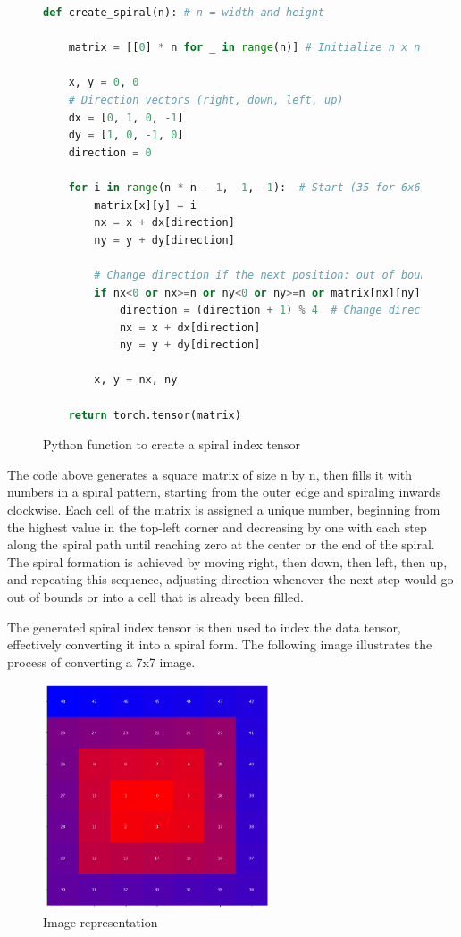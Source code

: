 \begin{figure}[H]
\centering
\begin{lstlisting}[language=Python]
def create_spiral(n): # n = width and height
    
    matrix = [[0] * n for _ in range(n)] # Initialize n x n matrix

    x, y = 0, 0
    # Direction vectors (right, down, left, up)
    dx = [0, 1, 0, -1]
    dy = [1, 0, -1, 0]
    direction = 0

    for i in range(n * n - 1, -1, -1):  # Start (35 for 6x6)
        matrix[x][y] = i
        nx = x + dx[direction]
        ny = y + dy[direction]

        # Change direction if the next position: out of bounds or filled
        if nx<0 or nx>=n or ny<0 or ny>=n or matrix[nx][ny]!=0:
            direction = (direction + 1) % 4  # Change direction
            nx = x + dx[direction]
            ny = y + dy[direction]

        x, y = nx, ny
    
    return torch.tensor(matrix)
\end{lstlisting}
\caption{Python function to create a spiral index tensor}
\label{fig:spiral_matrix}
\end{figure}

    The code above generates a square matrix of size n by n, then fills it with numbers in a spiral pattern, starting from the outer edge and spiraling inwards clockwise. Each cell of the matrix is assigned a unique number, beginning from the highest value in the top-left corner and decreasing by one with each step along the spiral path until reaching zero at the center or the end of the spiral. The spiral formation is achieved by moving right, then down, then left, then up, and repeating this sequence, adjusting direction whenever the next step would go out of bounds or into a cell that is already been filled.

    The generated spiral index tensor is then used to index the data tensor, effectively converting it into a spiral form. The following image illustrates the process of converting a 7x7 image.
    
    
    \begin{figure}[H]
    \centering
    \includegraphics[width=0.6\textwidth]{../code/dataAnalysis/plots/exampleImgs/spiralShowcase1.png}
    \caption{Image representation}
    \label{fig:spiral_indexing_1}        
    \end{figure}


